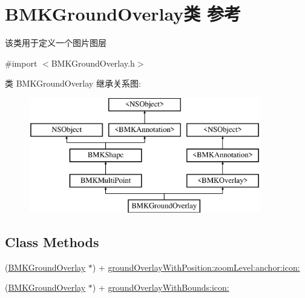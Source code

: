 \hypertarget{interface_b_m_k_ground_overlay}{}\section{B\+M\+K\+Ground\+Overlay类 参考}
\label{interface_b_m_k_ground_overlay}


该类用于定义一个图片图层  




{\ttfamily \#import $<$B\+M\+K\+Ground\+Overlay.\+h$>$}

类 B\+M\+K\+Ground\+Overlay 继承关系图\+:\begin{figure}[H]
\begin{center}
\leavevmode
\includegraphics[height=5.000000cm]{interface_b_m_k_ground_overlay}
\end{center}
\end{figure}
\subsection*{Class Methods}
\begin{DoxyCompactItemize}
\item 
(\hyperlink{interface_b_m_k_ground_overlay}{B\+M\+K\+Ground\+Overlay} $\ast$) + \hyperlink{interface_b_m_k_ground_overlay_a5c11881ef11601df44f714e321485d9e}{ground\+Overlay\+With\+Position\+:zoom\+Level\+:anchor\+:icon\+:}
\item 
(\hyperlink{interface_b_m_k_ground_overlay}{B\+M\+K\+Ground\+Overlay} $\ast$) + \hyperlink{interface_b_m_k_ground_overlay_a2b0872943e563bd7f8994cfca5841097}{ground\+Overlay\+With\+Bounds\+:icon\+:}
\end{DoxyCompactItemize}
